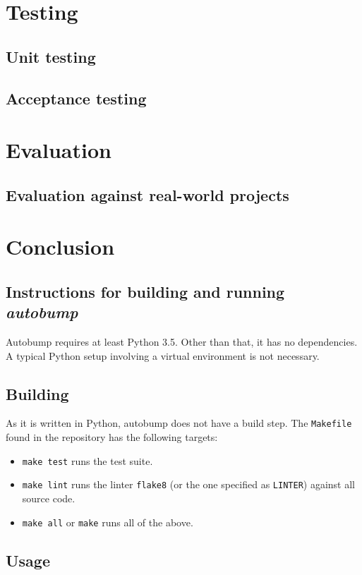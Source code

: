 \documentclass{l4proj}
\begin{document}
\chapter{Testing}

\section{Unit testing}

\section{Acceptance testing}

\chapter{Evaluation}


\section{Evaluation against real-world projects}


\chapter{Conclusion}

\begin{appendices}

\chapter{Instructions for building and running \textit{autobump}}

Autobump requires at least Python 3.5. Other than that, it has no
dependencies. A typical Python setup involving a virtual environment
is not necessary.

\section{Building}

As it is written in Python, autobump does not have a build step. The
\texttt{Makefile} found in the repository has the following targets:

\begin{itemize}
\item \texttt{make test} runs the test suite.
\item \texttt{make lint} runs the linter \texttt{flake8} (or the one
specified as \texttt{LINTER}) against all source code.
\item \texttt{make all} or \texttt{make} runs all of the above.
\end{itemize}

\section{Usage}

\end{appendices}



\end{document}
